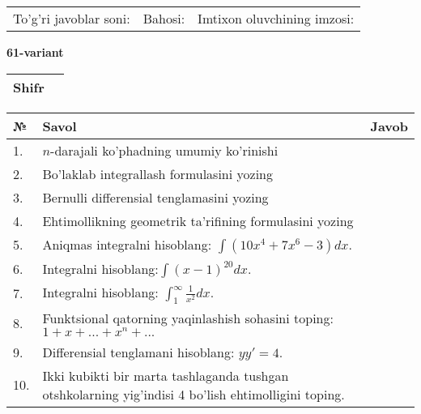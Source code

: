 \documentclass{article}
\begin{document}
  \vspace{1cm}
  
  \begin{tabular}{lll}
  To'g'ri javoblar soni: \underline{\hspace{1.5cm}} & 
  Bahosi: \underline{\hspace{1.5cm}} & 
  Imtixon oluvchining imzosi: \underline{\hspace{2cm}} \\
  \end{tabular}
  
  \egroup
  
  \newpage
  
  
  \textbf{61-variant}\\
  
  \bgroup
  \def\arraystretch{1.6} %
  
  \begin{tabular}{|m{5.7cm}|m{9.5cm}|}
  \hline
  Shifr & \\
  \hline
  \end{tabular}
  
  \vspace{1cm}
  
  \begin{tabular}{|m{0.7cm}|m{10cm}|m{4cm}|}
  \hline
  № & Savol & Javob \\
  \hline
  1. & \(n\)-darajali ko'phadning umumiy ko'rinishi &  \\
  \hline
  2. & Bo'laklab integrallash formulasini yozing &  \\
  \hline
  3. & Bernulli differensial tenglamasini yozing &  \\
  \hline
  4. & Ehtimollikning geometrik ta'rifining formulasini yozing &  \\
  \hline
  5. & Aniqmas integralni hisoblang: \(\int {\left( 10x^{4} + 7x^{6} - 3 \right)dx}\). &  \\
  \hline
  6. & Integralni hisoblang:\(\int {(x - 1)^{20}}dx\). &  \\
  \hline
  7. & Integralni hisoblang: \(\int_{1}^{\infty}{\frac{1}{x^{2}}dx}\). &  \\
  \hline
  8. & Funktsional qatorning yaqinlashish sohasini toping:\(1 + x + ... + x^{n} + ...\) &  \\
  \hline
  9. & Differensial tenglamani hisoblang: \(yy' = 4\). &  \\
  \hline
  10. & Ikki kubikti bir marta tashlaganda tushgan otshkolarning yig'indisi 4 bo'lish ehtimolligini toping. &  \\
  \hline
  \end{tabular}
  
\end{document}
